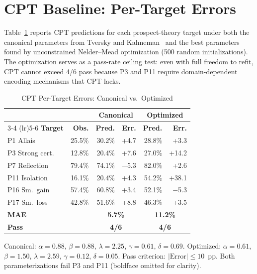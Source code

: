 \documentclass[journal]{IEEEtran}
\begin{document}
\balance

\appendices

\section{CPT Baseline: Per-Target Errors}
\label{app:cpt}

Table~\ref{tab:cpt_detail} reports CPT predictions for each prospect-theory target under both the canonical parameters from Tversky and Kahneman~\cite{tversky1992} and the best parameters found by unconstrained Nelder--Mead optimization (500 random initializations).
The optimization serves as a pass-rate ceiling test: even with full freedom to refit, CPT cannot exceed 4/6 pass because P3 and P11 require domain-dependent encoding mechanisms that CPT lacks.

\begin{table}[!h]
\renewcommand{\arraystretch}{1.15}
\caption{CPT Per-Target Errors: Canonical vs.\ Optimized}
\label{tab:cpt_detail}
\centering
\begin{tabular}{l r r r r r}
\toprule
& & \multicolumn{2}{c}{\textbf{Canonical}} & \multicolumn{2}{c}{\textbf{Optimized}} \\
\cmidrule(lr){3-4} \cmidrule(lr){5-6}
\textbf{Target} & \textbf{Obs.} & \textbf{Pred.} & \textbf{Err.} & \textbf{Pred.} & \textbf{Err.} \\
\midrule
P1 Allais       & 25.5\% & 30.2\% & +4.7  & 28.8\% & +3.3  \\
P3 Strong cert.  & 12.8\% & 20.4\% & +7.6  & 27.0\% & +14.2 \\
P7 Reflection   & 79.4\% & 74.1\% & $-$5.3 & 82.0\% & +2.6  \\
P11 Isolation   & 16.1\% & 20.4\% & +4.3  & 54.2\% & +38.1 \\
P16 Sm.\ gain   & 57.4\% & 60.8\% & +3.4  & 52.1\% & $-$5.3 \\
P17 Sm.\ loss   & 42.8\% & 51.6\% & +8.8  & 46.3\% & +3.5  \\
\midrule
\textbf{MAE}    &        & \multicolumn{2}{c}{\textbf{5.7\%}} & \multicolumn{2}{c}{\textbf{11.2\%}} \\
\textbf{Pass}   &        & \multicolumn{2}{c}{\textbf{4/6}}   & \multicolumn{2}{c}{\textbf{4/6}}   \\
\bottomrule
\end{tabular}
\begin{flushleft}
\footnotesize{Canonical: $\alpha=0.88$, $\beta=0.88$, $\lambda=2.25$, $\gamma=0.61$, $\delta=0.69$.
Optimized: $\alpha=0.61$, $\beta=1.50$, $\lambda=2.59$, $\gamma=0.12$, $\delta=0.05$.
Pass criterion: $|\text{Error}| \leq 10$~pp.
Both parameterizations fail P3 and P11 (boldface omitted for clarity).}
\end{flushleft}
\end{table}
\end{document}
